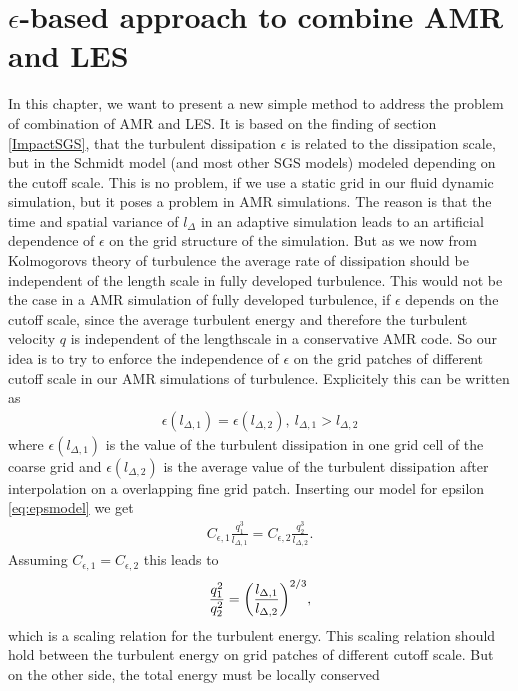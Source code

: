 \section{\texorpdfstring{$\epsilon$}{epsilon}-based approach to combine AMR and
LES}\label{epsilon}
In this chapter, we want to present a new simple method to address the problem
of combination of AMR and LES. It is based on the finding of section
\ref{ImpactSGS}, that the turbulent dissipation $\epsilon$ is related to the
dissipation scale, but in the Schmidt model (and most other SGS models) modeled
depending on the cutoff scale. This is no problem, if we use a static grid in
our fluid dynamic simulation, but it poses a problem in AMR simulations. The
reason is that the time and spatial variance of $l_{\Delta}$ in an adaptive
simulation leads to an artificial dependence of $\epsilon$ on the grid
structure of the simulation. But as we now from Kolmogorovs theory of turbulence
the average rate of dissipation should be independent of the length scale in
fully developed turbulence. This would not be the case in a AMR simulation of
fully developed turbulence, if $\epsilon$ depends on the cutoff scale, since
the average turbulent energy and therefore the turbulent velocity $q$ is 
independent of the lengthscale in a conservative AMR code. So our idea is to
try to enforce the independence of $\epsilon$ on the grid patches of different
cutoff scale in our AMR simulations of turbulence. Explicitely this can be
written as
\begin{align}
\epsilon(l_{\Delta,1})=\epsilon(l_{\Delta,2}),\
l_{\Delta,1} > l_{\Delta,2}
\end{align}
where $\epsilon(l_{\Delta,1})$ is the value of the turbulent dissipation in
one grid cell of the coarse grid and $\epsilon(l_{\Delta,2})$ is the average 
value of the turbulent dissipation after interpolation on a overlapping fine
grid patch.  
Inserting our model for epsilon \eqref{eq:epsmodel} we get
\begin{align}
C_{\epsilon,1}\frac{q_1^3}{l_{\Delta,1}}=
C_{\epsilon,2}\frac{q_2^3}{l_{\Delta,2}}.
\end{align}
Assuming $C_{\epsilon,1}=C_{\epsilon,2}$ this leads to
\begin{align}
\frac{q_1^2}{q_2^2}={ \left( \frac{l_{\Delta,1}}{l_{\Delta,2}} \right) }^{2/3},
\label{eq:qscale}
\end{align}
which is a scaling relation for the turbulent energy. This scaling relation
should hold between the turbulent energy on grid patches of different cutoff
scale. But on the other side, the total energy must be locally conserved
